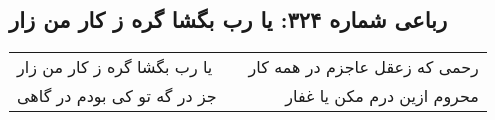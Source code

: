 \begin{center}
\section*{رباعی شماره ۳۲۴: یا رب بگشا گره ز کار من زار}
\label{sec:sh324}
\begin{longtable}{l p{0.5cm} r}
یا رب بگشا گره ز کار من زار
&&
رحمی که زعقل عاجزم در همه کار
\\
جز در گه تو کی بودم در گاهی
&&
محروم ازین درم مکن یا غفار
\\
\end{longtable}
\end{center}
